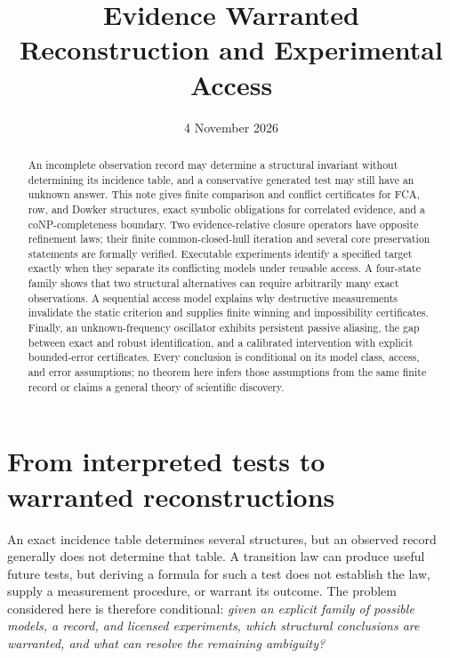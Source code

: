 \documentclass[11pt]{article}
\title{Evidence Warranted Reconstruction and Experimental Access}
\author{}
\date{4 November 2026}
\theoremstyle{definition}
\begin{document}
\maketitle
\begin{abstract}
An incomplete observation record may determine a structural invariant
without determining its incidence table, and a conservative generated
test may still have an unknown answer. This note gives finite comparison
and conflict certificates for FCA, row, and Dowker structures, exact
symbolic obligations for correlated evidence, and a coNP-completeness
boundary. Two evidence-relative closure operators have opposite refinement
laws; their finite common-closed-hull iteration and several core
preservation statements are formally verified. Executable experiments
identify a specified target exactly when they separate its conflicting
models under reusable access. A four-state family shows that two structural
alternatives can require arbitrarily many exact observations. A sequential
access model explains why destructive measurements invalidate the static
criterion and supplies finite winning and impossibility certificates.
Finally, an unknown-frequency oscillator exhibits persistent passive
aliasing, the gap between exact and robust identification, and a calibrated
intervention with explicit bounded-error certificates. Every conclusion is
conditional on its model class, access, and error assumptions; no theorem
here infers those assumptions from the same finite record or claims a
general theory of scientific discovery.
\end{abstract}
\tableofcontents

\section{From interpreted tests to warranted reconstructions}
\label{sec:orientation}

An exact incidence table determines several structures, but an observed
record generally does not determine that table. A transition law can
produce useful future tests, but deriving a formula for such a test does
not establish the law, supply a measurement procedure, or warrant its
outcome. The problem considered here is therefore conditional:
\emph{given an explicit family of possible models, a record, and licensed
experiments, which structural conclusions are warranted, and what can
resolve the remaining ambiguity?}
\end{document}
